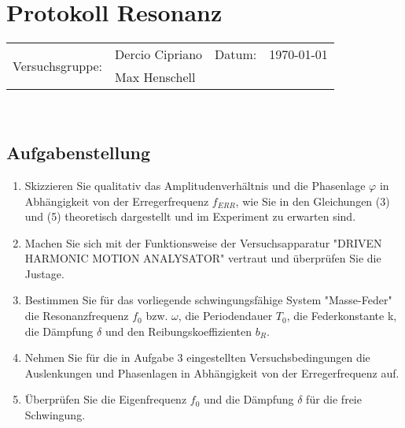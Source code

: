 \documentclass[a4paper,11pt]{scrartcl}
\begin{document}
	\centering \section*{Protokoll Resonanz}
	\begin{tabularx}{\textwidth}{r l r r}
			\multirow{2}{*}{Versuchsgruppe:}
				&Dercio Cipriano& Datum:&\today\\
				&Max Henschell& &\\
	\end{tabularx}
	\\
	\subsection*{Aufgabenstellung}
	\begin{enumerate}
		\item Skizzieren Sie qualitativ das Amplitudenverhältnis und die Phasenlage $\varphi$ in Abhängigkeit von der Erregerfrequenz $f_{ERR}$, wie Sie in den Gleichungen (3) und (5) theoretisch dargestellt und im Experiment zu erwarten sind.
		\item Machen Sie sich mit der Funktionsweise der Versuchsapparatur "DRIVEN HARMONIC MOTION ANALYSATOR" vertraut und überprüfen Sie die Justage.
		\item Bestimmen Sie für das vorliegende schwingungsfähige System "Masse-Feder" die Resonanzfrequenz $f_0$ bzw. $\omega$, die Periodendauer $T_0$, die Federkonstante k, die Dämpfung $\delta$ und den Reibungskoeffizienten $b_R$.
		\item Nehmen Sie für die in Aufgabe 3 eingestellten Versuchsbedingungen die Auslenkungen und Phasenlagen in Abhängigkeit von der Erregerfrequenz auf.
		\item Überprüfen Sie die Eigenfrequenz $f_0$ und die Dämpfung $\delta$ für die freie Schwingung.
	\end{enumerate}
	
\end{document}
